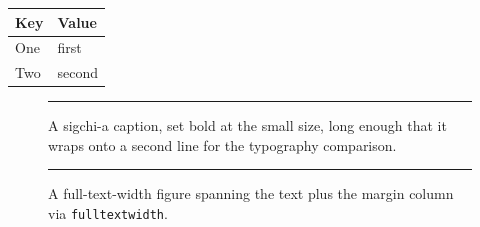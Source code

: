 \documentclass[sigchi-a]{acmart}
\begin{document}
\begin{margintable}
\begin{tabular}{ll}
\toprule
Key & Value \\
\midrule
One & first \\
Two & second \\
\bottomrule
\end{tabular}
\caption{A margin table caption.}
\end{margintable}

\begin{figure}[h]
\centering
\rule{6cm}{1.5cm}
\caption{A sigchi-a caption, set bold at the small size, long enough that it
wraps onto a second line for the typography comparison.}
\end{figure}

\begin{figure}[h]
\centering
\rule{\fulltextwidth}{1cm}
\caption{A full-text-width figure spanning the text plus the margin column via
\texttt{fulltextwidth}.}
\end{figure}
\end{document}
